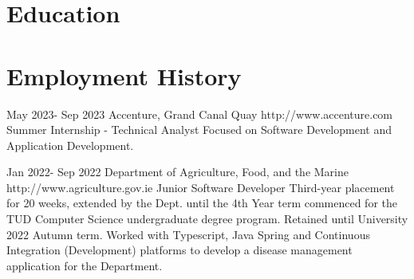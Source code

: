 \documentclass[10pt]{article} %
\begin{document}

\section{Education}







\section{Employment History}


\job
{May 2023}{- Sep 2023} {Accenture, Grand Canal Quay} {http://www.accenture.com}
{Summer Internship - Technical Analyst} {Focused on Software Development and
Application Development.}


\job
{Jan 2022}{- Sep 2022} {Department of Agriculture, Food, and the Marine}
{http://www.agriculture.gov.ie} {Junior Software Developer} {Third-year
placement for 20 weeks, extended by the Dept. until the 4th Year term commenced
for the TUD Computer Science undergraduate degree program. Retained until
University 2022 Autumn term. Worked with Typescript, Java Spring and Continuous
Integration (Development) platforms to develop a disease management application
for the Department.}
\end{document}
